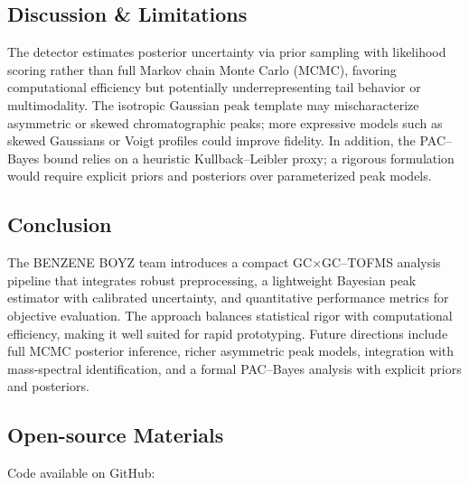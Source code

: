 \subsection*{Discussion \& Limitations}
The detector estimates posterior uncertainty via prior sampling with likelihood scoring rather than full Markov chain Monte Carlo (MCMC), favoring computational efficiency but potentially underrepresenting tail behavior or multimodality. The isotropic Gaussian peak template may mischaracterize asymmetric or skewed chromatographic peaks; more expressive models such as skewed Gaussians or Voigt profiles could improve fidelity. In addition, the PAC--Bayes bound relies on a heuristic Kullback--Leibler proxy; a rigorous formulation would require explicit priors and posteriors over parameterized peak models.

\subsection*{Conclusion}
The \textsc{BENZENE BOYZ} team introduces a compact GC$\times$GC--TOFMS analysis pipeline that integrates robust preprocessing, a lightweight Bayesian peak estimator with calibrated uncertainty, and quantitative performance metrics for objective evaluation. The approach balances statistical rigor with computational efficiency, making it well suited for rapid prototyping. Future directions include full MCMC posterior inference, richer asymmetric peak models, integration with mass-spectral identification, and a formal PAC--Bayes analysis with explicit priors and posteriors.

\subsection*{Open-source Materials}
Code available on GitHub: 






